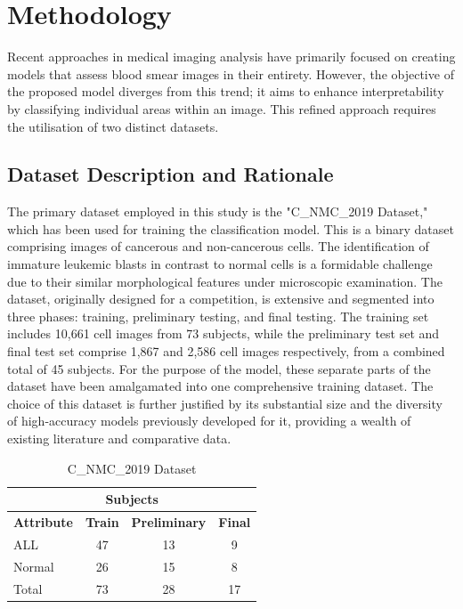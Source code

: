 \documentclass[
	a4paper,
	10pt,
	unnumberedsections,
	twoside,
]{research_article}
\begin{document}

\section{Methodology}

Recent approaches in medical imaging analysis have primarily focused on creating models that assess blood smear images in their entirety. However, the objective of the proposed model diverges from this trend; it aims to enhance interpretability by classifying individual areas within an image. This refined approach requires the utilisation of two distinct datasets.

\subsection{Dataset Description and Rationale}

The primary dataset employed in this study is the "C\_NMC\_2019 Dataset," which has been used for training the classification model. This is a binary dataset comprising images of cancerous and non-cancerous cells. The identification of immature leukemic blasts in contrast to normal cells is a formidable challenge due to their similar morphological features under microscopic examination. The dataset, originally designed for a competition, is extensive and segmented into three phases: training, preliminary testing, and final testing. The training set includes 10,661 cell images from 73 subjects, while the preliminary test set and final test set comprise 1,867 and 2,586 cell images respectively, from a combined total of 45 subjects. For the purpose of the model, these separate parts of the dataset have been amalgamated into one comprehensive training dataset. The choice of this dataset is further justified by its substantial size and the diversity of high-accuracy models previously developed for it, providing a wealth of existing literature and comparative data.

\begin{table}[ht]
	\caption{C\_NMC\_2019 Dataset}
	\centering
	\label{tab:datasets}
	\begin{tabular}{lccc}
		\multicolumn{4}{c}{Subjects} \\
		\hline
		\textbf{Attribute} & \textbf{Train} & \textbf{Preliminary} & \textbf{Final} \\
		\hline
		ALL & 47 & 13 & 9 \\
		Normal & 26 & 15 & 8 \\
		Total & 73 & 28 & 17 \\
		\hline
	\end{tabular}
\end{table}
\end{document}
